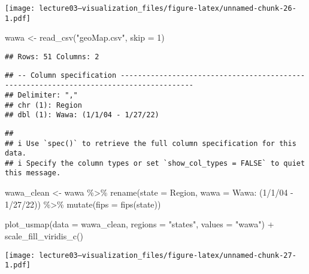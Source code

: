 \documentclass[
]{article}
\newenvironment{Shaded}{\begin{snugshade}}{\end{snugshade}}
\newcommand{\AttributeTok}[1]{\textcolor[rgb]{0.77,0.63,0.00}{#1}}
\newcommand{\DecValTok}[1]{\textcolor[rgb]{0.00,0.00,0.81}{#1}}
\newcommand{\FunctionTok}[1]{\textcolor[rgb]{0.00,0.00,0.00}{#1}}
\newcommand{\NormalTok}[1]{#1}
\newcommand{\OtherTok}[1]{\textcolor[rgb]{0.56,0.35,0.01}{#1}}
\newcommand{\SpecialCharTok}[1]{\textcolor[rgb]{0.00,0.00,0.00}{#1}}
\newcommand{\StringTok}[1]{\textcolor[rgb]{0.31,0.60,0.02}{#1}}
\begin{document}
\texttt{[image: lecture03---visualization\_files/figure-latex/unnamed-chunk-26-1.pdf]}

\begin{Shaded}
\begin{Highlighting}[]
\NormalTok{wawa }\OtherTok{\textless{}{-}} \FunctionTok{read\_csv}\NormalTok{(}\StringTok{"geoMap.csv"}\NormalTok{, }\AttributeTok{skip =} \DecValTok{1}\NormalTok{)}
\end{Highlighting}
\end{Shaded}

\begin{verbatim}
## Rows: 51 Columns: 2
\end{verbatim}

\begin{verbatim}
## -- Column specification ---------------------------------------------------------------------------------------
## Delimiter: ","
## chr (1): Region
## dbl (1): Wawa: (1/1/04 - 1/27/22)
\end{verbatim}

\begin{verbatim}
## 
## i Use `spec()` to retrieve the full column specification for this data.
## i Specify the column types or set `show_col_types = FALSE` to quiet this message.
\end{verbatim}

\begin{Shaded}
\begin{Highlighting}[]
\NormalTok{wawa\_clean }\OtherTok{\textless{}{-}}\NormalTok{ wawa }\SpecialCharTok{\%\textgreater{}\%} \FunctionTok{rename}\NormalTok{(}\AttributeTok{state =}\NormalTok{ Region,}
                \AttributeTok{wawa =} \StringTok{\textasciigrave{}}\AttributeTok{Wawa: (1/1/04 {-} 1/27/22)}\StringTok{\textasciigrave{}}\NormalTok{) }\SpecialCharTok{\%\textgreater{}\%} 
  \FunctionTok{mutate}\NormalTok{(}\AttributeTok{fips =} \FunctionTok{fips}\NormalTok{(state))}
  
\FunctionTok{plot\_usmap}\NormalTok{(}\AttributeTok{data =}\NormalTok{ wawa\_clean, }\AttributeTok{regions =} \StringTok{"states"}\NormalTok{, }\AttributeTok{values =} \StringTok{"wawa"}\NormalTok{) }\SpecialCharTok{+}
\FunctionTok{scale\_fill\_viridis\_c}\NormalTok{()}
\end{Highlighting}
\end{Shaded}

\texttt{[image: lecture03---visualization\_files/figure-latex/unnamed-chunk-27-1.pdf]}
\end{document}
